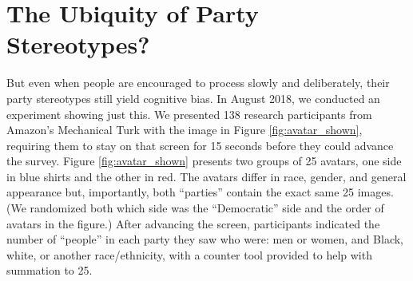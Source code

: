 \documentclass[12pt, letterpaper]{article}
\begin{document}

\section{The Ubiquity of Party Stereotypes?}

But even when people are encouraged to process slowly and deliberately, their party stereotypes still yield cognitive bias. In August 2018, we conducted an experiment showing just this. We presented 138 research participants from Amazon's Mechanical Turk with the image in Figure \ref{fig:avatar_shown}, requiring them to stay on that screen for 15 seconds before they could advance the survey. Figure \ref{fig:avatar_shown} presents two groups of 25 avatars, one side in blue shirts and the other in red. The avatars differ in race, gender, and general appearance but, importantly, both ``parties'' contain the exact same 25 images. (We randomized both which side was the ``Democratic'' side and the order of avatars in the figure.) After advancing the screen, participants indicated the number of ``people'' in each party they saw who were: men or women, and Black, white, or another race/ethnicity, with a counter tool provided to help with summation to 25. 
\end{document}
